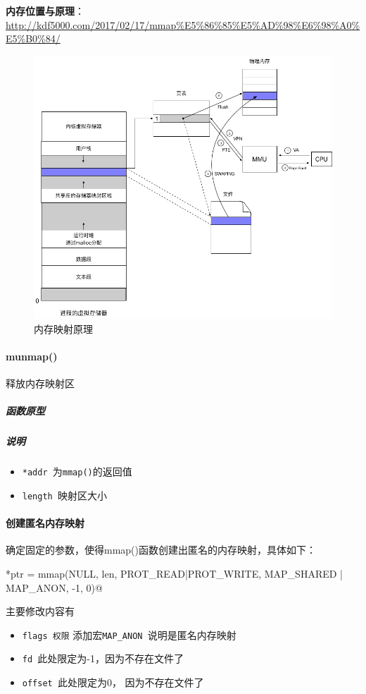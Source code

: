 \documentclass[UTF8,a4paper,12pt]{ctexbook}
\begin{document}
		\textbf{ 内存位置与原理}：\url{http://kdf5000.com/2017/02/17/mmap%E5%86%85%E5%AD%98%E6%98%A0%E5%B0%84/}
			\begin{figure}[H]
				\centering
				\includegraphics[scale=0.3]{mmap_pgfault.png}
				\caption{内存映射原理}
			\end{figure}		
			
			
		\paragraph{munmap()}释放内存映射区
			\subparagraph{函数原型}
		
			\subparagraph{说明}
				\begin{itemize}[itemindent = 1em]
					\item \verb|*addr |为\verb|mmap()|的返回值
					\item \verb|length |映射区大小
				\end{itemize}
		
		
		\paragraph{创建匿名内存映射}
			确定固定的参数，使得mmap()函数创建出匿名的内存映射，具体如下：
			
			\verb@void *ptr = mmap(NULL, len, PROT_READ|PROT_WRITE, MAP_SHARED | MAP_ANON, -1, 0)@
			
			主要修改内容有
				\begin{itemize}[itemindent = 1em]
					\item \verb|flags 权限| 添加宏\verb|MAP_ANON |说明是匿名内存映射
					\item \verb|fd |此处限定为-1，因为不存在文件了
					\item \verb|offset |此处限定为0， 因为不存在文件了
				\end{itemize}
		
\end{document}
